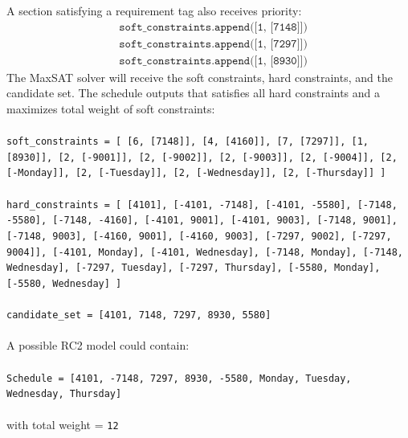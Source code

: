 \documentclass[11pt, a4paper]{article} %
\newcommand{\<}{\langle}
\renewcommand{\>}{\rangle}
\begin{document}
  A section satisfying a requirement tag also receives priority:
    \begin{align*}
    &\texttt{soft\_constraints.append([1, [7148]])}\\
    &\texttt{soft\_constraints.append([1, [7297]])}\\
    &\texttt{soft\_constraints.append([1, [8930]])}
\end{align*}
The MaxSAT solver will receive the soft constraints, hard constraints, and the candidate set. The schedule outputs that satisfies all hard constraints and a maximizes total weight of soft constraints:\\ \\
  \texttt{soft\_constraints = [ [6, [7148]], [4, [4160]], [7, [7297]], [1, [8930]], [2, [-9001]], [2, [-9002]], [2, [-9003]], [2, [-9004]], [2, [-Monday]], [2, [-Tuesday]], [2, [-Wednesday]], [2, [-Thursday]] ]} \\ \\
  \texttt{hard\_constraints = [ [4101], [-4101, -7148], [-4101, -5580], [-7148, -5580], [-7148, -4160], [-4101, 9001], [-4101, 9003], [-7148, 9001], [-7148, 9003], [-4160, 9001], [-4160, 9003], [-7297, 9002], [-7297, 9004]], [-4101, Monday], [-4101, Wednesday], [-7148, Monday], [-7148, Wednesday], [-7297, Tuesday], [-7297, Thursday], [-5580, Monday], [-5580, Wednesday] ]} \\ \\
  \texttt{candidate\_set = [4101, 7148, 7297, 8930, 5580]} \\ \\
A possible RC2 model could contain: \\ \\
\texttt{Schedule = [4101, -7148, 7297, 8930, -5580, Monday, Tuesday, Wednesday, Thursday]}\\ \\
with total weight = \texttt{12} \\
\end{document}
